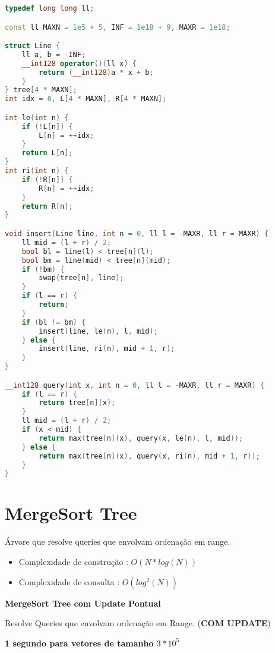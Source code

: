 \documentclass[11pt, a4paper, oneside]{book}
\begin{document}
\begin{multicols}{2}
\begin{lstlisting}[language=C++]
typedef long long ll;

const ll MAXN = 1e5 + 5, INF = 1e18 + 9, MAXR = 1e18;

struct Line {
    ll a, b = -INF;
    __int128 operator()(ll x) {
        return (__int128)a * x + b;
    }
} tree[4 * MAXN];
int idx = 0, L[4 * MAXN], R[4 * MAXN];

int le(int n) {
    if (!L[n]) {
        L[n] = ++idx;
    }
    return L[n];
}
int ri(int n) {
    if (!R[n]) {
        R[n] = ++idx;
    }
    return R[n];
}

void insert(Line line, int n = 0, ll l = -MAXR, ll r = MAXR) {
    ll mid = (l + r) / 2;
    bool bl = line(l) < tree[n](l);
    bool bm = line(mid) < tree[n](mid);
    if (!bm) {
        swap(tree[n], line);
    }
    if (l == r) {
        return;
    }
    if (bl != bm) {
        insert(line, le(n), l, mid);
    } else {
        insert(line, ri(n), mid + 1, r);
    }
}

__int128 query(int x, int n = 0, ll l = -MAXR, ll r = MAXR) {
    if (l == r) {
        return tree[n](x);
    }
    ll mid = (l + r) / 2;
    if (x < mid) {
        return max(tree[n](x), query(x, le(n), l, mid));
    } else {
        return max(tree[n](x), query(x, ri(n), mid + 1, r));
    }
}
\end{lstlisting}
\end{multicols}

\hfill

\section{MergeSort Tree}


Árvore que resolve queries que envolvam ordenação em range.



\begin{itemize}
\item Complexidade de construção : $O(N * log(N))$
\item Complexidade de consulta : $O(log^2(N))$
\end{itemize}



\textbf{MergeSort Tree com Update Pontual} 



Resolve Queries que envolvam ordenação em Range. (\textbf{COM UPDATE})  

\textbf{1 segundo para vetores de tamanho $3 * 10^5$}
\end{document}
